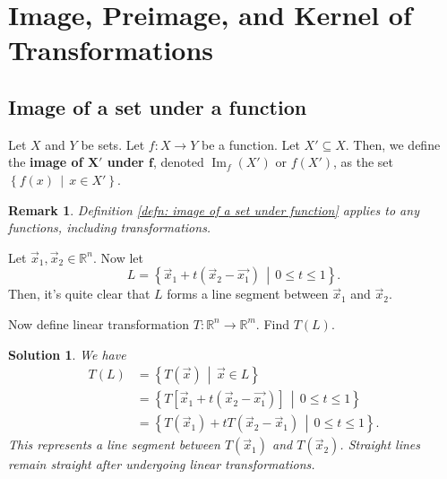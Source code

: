 \documentclass[]{book}
\DeclareMathOperator{\image}{Im}
\newcommand{\suchthat}{\,\middle|\,}
\newcommand{\R}{\ensuremath{\mathbb{R}}}
\newtheorem*{solution}{Solution}
\newtheorem*{remark}{Remark}
\begin{document}
\section{Image, Preimage, and Kernel of Transformations}
\label{section: image, preimage, and kernel of transformations}
\subsection{Image of a set under a function}
\begin{definition}
    \label{defn: image of a set under function}
    Let $X$ and $Y$ be sets. Let $f:X \to Y$ be a function. Let $X' \subseteq X$. Then, we define the \textbf{image of $\pmb{X'}$ under $\pmb{f}$}, denoted $\image_{f}(X')$ or $f(X')$, as the set
    $\left\{f(x) \suchthat x \in X'\right\}$.
\end{definition}
\begin{remark}
    Definition \ref{defn: image of a set under function} applies to any functions, including transformations.
\end{remark}
\begin{example}
    Let $\vec{x}_1,\vec{x}_2 \in \R^n$. Now let
    \[L = \left\{\vec{x}_1 + t(\vec{x}_2 - \vec{x_1}) \suchthat 0 \leq t \leq 1\right\}.\]
    Then, it's quite clear that $L$ forms a line segment between $\vec{x}_1$ and $\vec{x}_2$.
    
    Now define linear transformation $T:\R^n \to \R^m$. Find $T(L)$.
\begin{solution}
    We have
    \begin{align}
        T(L) &= \left\{T(\vec{x}) \suchthat \vec{x} \in L\right\} \\
        &= \left\{T\left[\vec{x}_1 + t(\vec{x}_2 - \vec{x_1})\right] \suchthat 0 \leq t \leq 1\right\} \\
        &= \left\{T(\vec{x}_1) + tT(\vec{x}_2 - \vec{x}_1) \suchthat 0 \leq t \leq 1\right\}.
    \end{align}
    This represents a line segment between $T(\vec{x}_1)$ and $T(\vec{x}_2)$. Straight lines remain straight after undergoing linear transformations. \hfill \qedsymbol
\end{solution}

\end{example}
\end{document}
